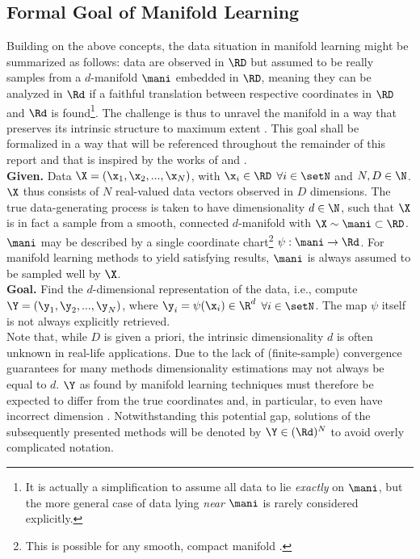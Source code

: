 






\subsection{Formal Goal of Manifold Learning}
\label{mani-goal}

Building on the above concepts, the data situation in manifold learning 
might be summarized as follows: data are observed in $\RD$ but assumed to 
be really samples from a $d$-manifold $\mani$ embedded in $\RD$, meaning they 
can be analyzed in $\Rd$ if a faithful translation between respective 
coordinates in $\RD$ and $\Rd$ is found\footnote{
It is actually a simplification to assume all data to lie \textit{exactly} on 
$\mani$, but the more general case of data lying \textit{near} $\mani$ is rarely 
considered explicitly.
}.
The challenge is thus to unravel the manifold in a way that preserves its 
intrinsic structure to maximum extent \citep{sauletal2006}.
This goal shall be formalized in a way that will be referenced throughout the 
remainder of this report and that is inspired by the works of \citet{cayton2005} 
and \citet{sauletal2006}.
\\

\textbf{Given.} Data $\X = (\x_1, \x_2, ..., \x_N)$, with 
$\x_i \in \RD$ $\forall i \in \setN$ and $N, D \in \N$. 
$\X$ thus consists of $N$ real-valued data vectors observed in $D$ 
dimensions.
The true data-generating process is taken to have dimensionality $d \in \N$, 
such that $\X$ is in fact a sample from a smooth, connected $d$-manifold with
$\X \sim \mani \subset \RD$.
$\mani$ may be described by a single coordinate chart\footnote{
This is possible for any smooth, compact manifold \citep{cayton2005}.
} $\psi: \mani \rightarrow \Rd$.
For manifold learning methods to yield satisfying results, $\mani$ is always 
assumed to be sampled well by $\X$.
\\

\textbf{Goal.} Find the $d$-dimensional representation of the data, 
i.e., compute \\$\Y = (\y_1, \y_2, ..., \y_N)$, where 
$\y_i = \psi(\x_i) \in \R^d$ $\forall i \in \setN$.
The map $\psi$ itself is not always explicitly retrieved.
\\

Note that, while $D$ is given a priori, the intrinsic dimensionality $d$ is 
often unknown in real-life applications.
Due to the lack of (finite-sample) convergence guarantees for many methods 
dimensionality estimations may not always be equal to $d$.
$\Y$ as found by manifold learning techniques must therefore be expected to 
differ from the true coordinates and, in particular, to even have incorrect 
dimension \citep{sauletal2006}.
Notwithstanding this potential gap, solutions of the subsequently presented 
methods will be denoted by $\Y \in (\Rd)^N$ to avoid overly complicated 
notation.
